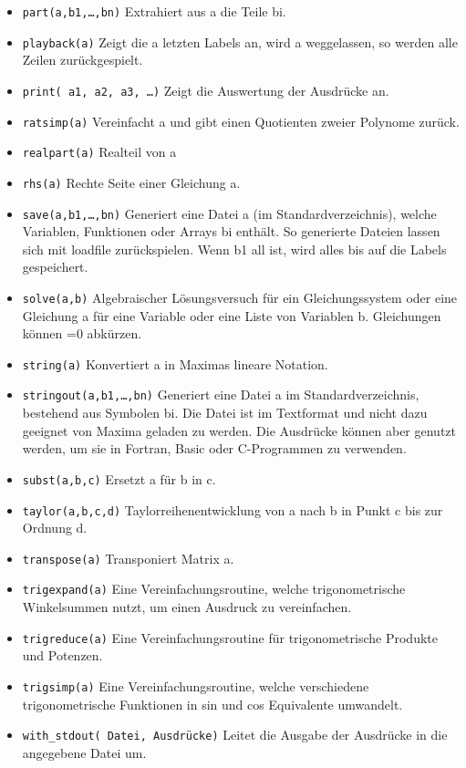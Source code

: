 \documentclass[12pt]{scrartcl}
\begin{document}
\begin{itemize}
\item \texttt{part(a,b1,\ldots,bn)} Extrahiert aus a die Teile bi.
\item \texttt{playback(a)} Zeigt die a letzten Labels an, wird a
  weggelassen, so  werden alle Zeilen zurückgespielt.
\item \texttt{print( a1, a2, a3, \ldots )} Zeigt die Auswertung der
  Ausdrücke  an.
\item \texttt{ratsimp(a)} Vereinfacht a und gibt einen Quotienten zweier
  Polynome  zurück.
\item \texttt{realpart(a)} Realteil von a
\item \texttt{rhs(a)} Rechte Seite einer Gleichung a.
\item \texttt{save(a,b1,\ldots,bn)} Generiert eine Datei a (im
  Standardverzeichnis), welche Variablen, Funktionen oder Arrays bi
  enthält. So generierte Dateien  lassen sich mit loadfile
  zurückspielen. Wenn b1  all ist, wird alles bis auf die Labels gespeichert.
\item \texttt{solve(a,b)} Algebraischer Lösungsversuch für ein
  Gleichungssystem  oder eine Gleichung a für eine Variable oder eine
  Liste von  Variablen b. Gleichungen können =0 abkürzen.
\item \texttt{string(a)} Konvertiert a in Maximas lineare Notation.
\item \texttt{stringout(a,b1,\ldots,bn)} Generiert eine Datei a im
  Standardverzeichnis, bestehend aus Symbolen bi. Die Datei ist im
  Textformat und nicht dazu geeignet von Maxima geladen zu werden. Die
  Ausdrücke können aber genutzt werden,  um sie in Fortran, Basic oder
  C-Programmen  zu verwenden.
\item \texttt{subst(a,b,c)} Ersetzt a für b in c.
\item \texttt{taylor(a,b,c,d)} Taylorreihenentwicklung von a nach b in
  Punkt c  bis zur Ordnung d.
\item \texttt{transpose(a)} Transponiert Matrix a.
\item \texttt{trigexpand(a)} Eine Vereinfachungsroutine, welche
  trigonometrische  Winkelsummen nutzt, um einen Ausdruck zu vereinfachen.
\item \texttt{trigreduce(a)} Eine Vereinfachungsroutine für
  trigonometrische  Produkte und Potenzen.
\item \texttt{trigsimp(a)} Eine Vereinfachungsroutine, welche
  verschiedene  trigonometrische Funktionen in sin und cos Equivalente umwandelt.
\item \texttt{with\_stdout( Datei, Ausdrücke)} Leitet die Ausgabe der
  Ausdrücke  in die angegebene Datei um.
\end{itemize}
\end{document}
